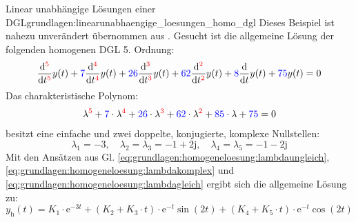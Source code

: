 \begin{frame}
{    \begin{bsp}{Linear unabhängige Lösungen einer DGL}{grundlagen:linearunabhaengige_loesungen_homo_dgl}
        Dieses Beispiel ist nahezu unverändert übernommen aus \cite[S. 241]{albach}. 
        Gesucht ist die allgemeine Lösung der folgenden homogenen DGL 5. Ordnung:
        \begin{equation*}
            \frac{\mathrm{d}^{{\color{red}5}}}{\mathrm{d}t^{{\color{red}5}}} y(t) + {\color{blue}7} \frac{\mathrm{d}^{{\color{red}4}}}{\mathrm{d}t^{{\color{red}4}}} y(t) + {\color{blue}26} \frac{\mathrm{d}^{{\color{red}3}}}{\mathrm{d}t^{{\color{red}3}}} y(t) + {\color{blue}62} \frac{\mathrm{d}^{{\color{red}2}}}{\mathrm{d}t^{{\color{red}2}}} y(t) + {\color{blue}8} \frac{\mathrm{d}}{\mathrm{d}t} y(t) + {\color{blue}75} y(t) = 0
        \end{equation*}
        Das charakteristische Polynom:
        \begin{equation*}
            \lambda^{{\color{red}5}} + {\color{blue}7} \cdot \lambda^{{\color{red}4}} + {\color{blue}26} \cdot \lambda^{{\color{red}3}} + {\color{blue}62} \cdot \lambda^{{\color{red}2}} + {\color{blue}85} \cdot \lambda + {\color{blue}75} = 0
        \end{equation*}
        besitzt eine einfache und zwei doppelte, konjugierte, komplexe Nullstellen:
        \begin{equation*}
            \lambda_1 = -3, \quad \lambda_2 = \lambda_3 = -1+\mathrm{2j}, \quad \lambda_4 = \lambda_5 = -1-\mathrm{2j}
        \end{equation*}
        Mit den Ansätzen aus Gl. \ref{eq:grundlagen:homogeneloesung:lambdaungleich}, \ref{eq:grundlagen:homogeneloesung:lambdakomplex} und
        \ref{eq:grundlagen:homogeneloesung:lambdagleich} ergibt sich die allgemeine Lösung zu:
        \begin{equation*}
            y_{\mathrm{h}}(t) = K_1 \cdot \mathrm{e}^{-3 t} + (K_2 + K_3 \cdot t) \cdot \mathrm{e}^{-t} \sin(2t) + (K_4 + K_5 \cdot t) \cdot \mathrm{e}^{-t} \cos(2t)
        \end{equation*}
    \end{bsp}
}%
\end{frame}
